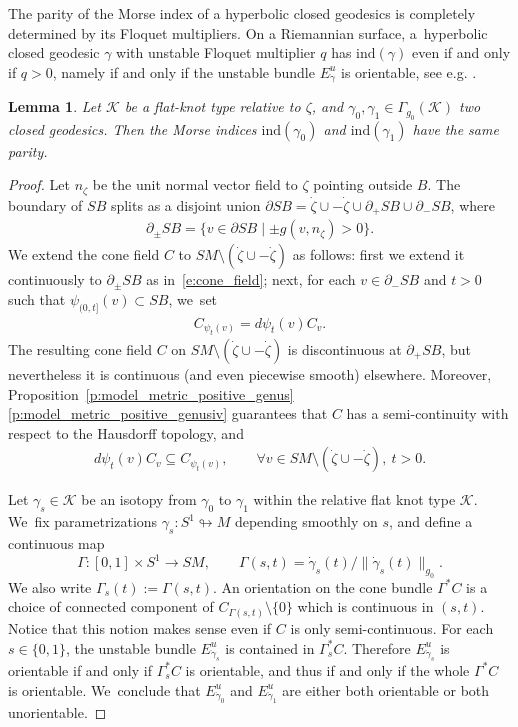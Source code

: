 \documentclass[11pt]{article}
\let\sep\mid
\newcommand{\KK}{\mathcal{K}}
\newcommand{\ind}{\mathrm{ind}}
\newcommand{\Eu}{E^u}
\theoremstyle{plain}
\newtheorem{Lemma}[Thm]{Lemma}
\theoremstyle{definition}
\begin{document}
The parity of the Morse index of a hyperbolic closed geodesics is completely determined by its Floquet multipliers. On a Riemannian surface, a~hyperbolic closed geodesic $\gamma$ with unstable Floquet multiplier $q$ has $\ind(\gamma)$ even if and only if $q>0$, namely if and only if the unstable bundle $\Eu_{\dot\gamma}$ is orientable, see e.g. \cite[Cor.\,3.6]{Wilking:2001aa}.

\begin{Lemma}\label{l:same_parity}
Let $\KK$ be a flat-knot type relative to $\zeta$, and $\gamma_0,\gamma_1\in\Gamma_{g_0}(\KK)$ two closed geodesics. Then the Morse indices $\ind(\gamma_0)$ and $\ind(\gamma_1)$ have the same parity.
\end{Lemma}

\begin{proof}
Let $n_\zeta$ be the unit normal vector field to $\zeta$ pointing outside $B$.
The boundary of $SB$ splits as a disjoint union $\partial SB=\dot\zeta\cup-\dot\zeta\cup\partial_+SB\cup\partial_-SB$, where
\begin{align*}
\partial_\pm SB
=
\big\{ v\in\partial SB\sep \pm g(v,n_\zeta)>0 \big\}.
\end{align*}
We extend the cone field $C$ to $SM\setminus(\dot\zeta\cup-\dot\zeta)$ as follows: first we extend it continuously to $\partial_\pm SB $ as in~\eqref{e:cone_field}; next, for each $v\in\partial_-SB$ and $t>0$ such that $\psi_{(0,t]}(v)\subset SB$, we~set
\begin{align*}
C_{\psi_t(v)} = d\psi_t(v)C_v.
\end{align*}
The resulting cone field $C$ on $SM\setminus(\dot\zeta\cup-\dot\zeta)$ is discontinuous at $\partial_+SB$, but nevertheless it is continuous (and even piecewise smooth) elsewhere. Moreover, Proposition~\ref{p:model_metric_positive_genus}\eqref{p:model_metric_positive_genusiv} guarantees that $C$ has a semi-continuity with respect to the Hausdorff topology, and
\begin{align*}
d\psi_t(v)C_v\subseteq C_{\psi_t(v)},
\qquad \forall v\in SM\setminus(\dot\zeta\cup-\dot\zeta),\ t>0.
\end{align*}

Let $\gamma_s\in\KK$ be an isotopy from $\gamma_0$ to $\gamma_1$ within the relative flat knot type $\KK$. We~fix parametrizations $\gamma_s:S^1\looparrowright M$ depending smoothly on $s$, and define a continuous map
\[
 \Gamma:[0,1]\times S^1\to SM,\qquad \Gamma(s,t)=\dot\gamma_s(t)/\|\dot\gamma_s(t)\|_{g_0}.
\]
We also write $\Gamma_s(t):=\Gamma(s,t)$.
An orientation on the cone bundle $\Gamma^*C$ is a choice of connected component of $C_{\Gamma(s,t)}\setminus\{0\}$ which is continuous in $(s,t)$. Notice that this notion makes sense even if $C$ is only semi-continuous. For each $s\in\{0,1\}$, the unstable bundle $\Eu_{\dot\gamma_s}$ is contained in $\Gamma_s^*C$. Therefore $\Eu_{\dot\gamma_s}$ is orientable if and only if $\Gamma_s^*C$ is orientable, and thus if and only if the whole $\Gamma^*C$ is orientable. We~conclude that $\Eu_{\dot\gamma_0}$ and $\Eu_{\dot\gamma_1}$ are either both orientable or both unorientable.
\end{proof}
\end{document}
